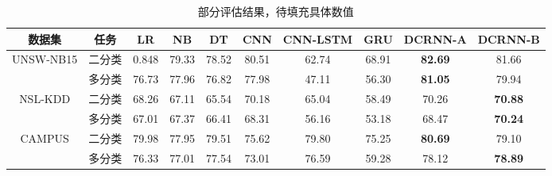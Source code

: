 \begin{table*}[t]
    \small
    \caption{部分评估结果，待填充具体数值}
    \label{table2}
    \centering
    \begin{tabular}{c|c|ccc|ccc|cc}
    \toprule
    
     数据集 &  任务  &  
     LR &  NB & DT & CNN & CNN-LSTM & GRU & DCRNN-A & DCRNN-B \\
    \midrule
    
    
    UNSW-NB15 & 二分类 & 0.848 & 79.33 & 78.52 &  80.51 & 62.74 & 68.91 & \textbf{82.69} & 81.66 \\ 
    
    & 多分类 &76.73 & 77.96 & 76.82 & 77.98 & 47.11 & 56.30 & \textbf{81.05} & 79.94 \\
    
    \midrule
    NSL-KDD & 二分类 & 68.26 & 67.11 & 65.54 & 70.18 & 65.04 & 58.49 & 70.26 & \textbf{70.88} \\
    & 多分类 & 67.01 & 67.37 & 66.41 & 68.31 & 56.16 & 53.18 & 68.47 & \textbf{70.24} \\
    \midrule
    CAMPUS & 二分类 & 79.98 & 77.95 & 79.51 & 75.62 & 79.80 & 75.25 & \textbf{80.69} & 79.10\\
    & 多分类 & 76.33 & 77.01 & 77.54 & 73.01 & 76.59 & 59.28 & 78.12 & \textbf{78.89}\\
    
     \bottomrule
    
    \end{tabular}
    \end{table*}

